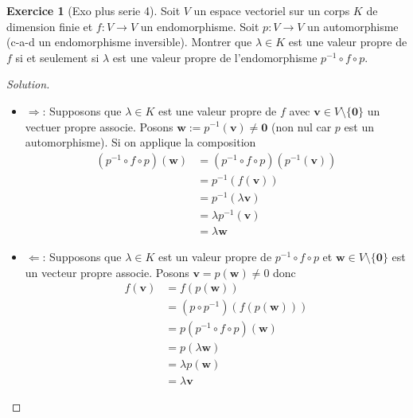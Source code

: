 \documentclass[a4paper,11pt,french]{report}
\theoremstyle{plain}
\theoremstyle{definition}
\newtheorem{exercise}{Exercice}[chapter]
\begin{document}
\begin{exercise}[Exo plus serie 4]
Soit $V$ un espace vectoriel sur un corps $K$ de dimension finie et $f:V\to V$ un endomorphisme. Soit $p:V\to V$ un automorphisme (c-a-d un endomorphisme inversible). Montrer que $\lambda \in K$ est une valeur propre de $f$ si et seulement si $\lambda$ est une valeur propre de l'endomorphisme $p ^{-1}\circ f \circ p$.
\end{exercise}
\begin{proof}[Solution]
\begin{itemize}
\item $\Rightarrow$: Supposons que $\lambda \in K$ est une valeur propre de $f$ avec $\boldsymbol{v}\in V\setminus \{ \boldsymbol{0} \}$ un vectuer propre associe. Posons $\boldsymbol{w}:=p ^{-1}(\boldsymbol{v})\neq \boldsymbol{0}$ (non nul car $p$ est un automorphisme). Si on applique la composition
\begin{align*}
(p ^{-1} \circ f \circ p)(\boldsymbol{w}) & =(p ^{-1} \circ f \circ p)(p ^{-1}(\boldsymbol{v})) \\
 & =p ^{-1} (f(\boldsymbol{v})) \\
 & = p ^{-1} (\lambda \boldsymbol{v}) \\
 & =\lambda p ^{-1} (\boldsymbol{v}) \\
 & =\lambda \boldsymbol{w}
\end{align*}

\item $\Leftarrow$: Supposons que $\lambda \in K$ est un valeur propre de $p ^{-1} \circ f \circ p$ et $\boldsymbol{w}\in V\setminus \{ \boldsymbol{0} \}$ est un vecteur propre associe. Posons $\boldsymbol{v}=p(\boldsymbol{w})\neq 0$ donc
\begin{align*}
f(\boldsymbol{v}) & =f(p(\boldsymbol{w})) \\
 & =(p \circ p ^{-1})(f(p(\boldsymbol{w}))) \\
 & =p(p ^{-1} \circ f \circ p)(\boldsymbol{w}) \\
 & = p(\lambda \boldsymbol{w}) \\  & =\lambda p(\boldsymbol{w})\\
 & = \lambda \boldsymbol{v}
\end{align*}
\end{itemize}
\end{proof}
\end{document}
